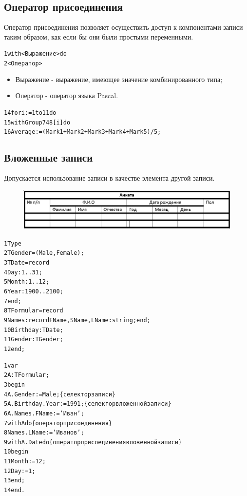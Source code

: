 \documentclass{beamer}
\begin{document}
\subsection{Оператор присоединения}
\begin{frame}[fragile]
\begin{block}{Оператор присоединения}
позволяет осуществить доступ к компонентами записи таким образом, как если бы они были простыми переменными.	
\end{block}
\begin{alltt}
1 with <Выражение> do
2   <Оператор>
\end{alltt}
\begin{itemize}
\item Выражение - выражение, имеющее значение комбинированного типа;
\item Оператор - оператор языка Pascal.
\end{itemize}
\begin{alltt}
14 for i := 1 to 11 do
15   with Group748[i] do
16     Average := (Mark1 + Mark2 + Mark3 + Mark4 + Mark5)/5;
\end{alltt}
\end{frame} 

\subsection{Вложенные записи}
\begin{frame}[fragile]
Допускается использование записи в качестве элемента другой записи.
\begin{figure}
\centering
\includegraphics[scale=0.4]{images/record-02.png}
\end{figure}
\begin{alltt}
1 Type
2  TGender = (Male, Female);
3  TDate = record 
4    Day: 1..31;
5    Month: 1..12;
6    Year: 1900..2100;
7  end;  
8  TFormular = record
9    Names: record FName, SName, LName: string; end;
10   Birthday: TDate;
11   Gender: TGender;
12 end;
\end{alltt}
\end{frame} 

\begin{frame}[fragile]
\begin{alltt}
1 var
2  A: TFormular; 
3 begin
4   A.Gender := Male; \{селектор записи\}
5   A.Birthday.Year := 1991; \{селектор вложенной записи\}
6   A.Names.FName := 'Иван'; 
7   with A do \{оператор присоединения\}
8     Names.LName := 'Иванов';
9   with A.Date do \{оператор присоединения вложенной записи \}
10  begin
11    Month := 12;   
12    Day := 1;
13  end;
14 end.
\end{alltt}
\end{frame} 
\end{document}
